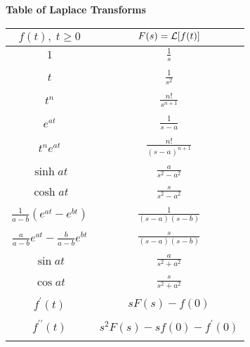 \renewcommand{\baselinestretch}{1.1}

\pagestyle{empty}
\setlength{\textheight}{300mm}
\setlength{\topmargin}{-30mm}
\pagestyle{empty}


\begin{center}
{\large\bf Table of Laplace Transforms}\\
\vspace{0.5cm}
\begin{tabular}{|c|c|}
\hline
$f(t), \; t \geq 0 $ & $ F(s) = {\cal L}[f(t)]$\\
\hline
$1$ &$\frac{1}{s}$  \\
 & \\
$t$ &$\frac{1}{s^{2}}$  \\
& \\
$t^{n}$ &$\frac{n!}{s^{n+1}}$\\
& \\
$e^{at}$&$\frac{1}{s-a}$\\
& \\
$t^{n}e^{at}$&$\frac{n!}{(s-a)^{n+1}}$\\
& \\
$\sinh at$&$\frac{a}{s^{2}-a^{2}}$\\
& \\
$\cosh at$&$\frac{s}{s^{2}-a^{2}}$\\
& \\
$ \frac{1}{a-b}(e^{at}-e^{bt}) $ & $ \frac{1}{(s-a)(s-b)} $\\
& \\
$\frac{a}{a-b}e^{at} - \frac{b}{a-b}e^{bt} $ & $\frac{s}{(s-a)(s-b)} $ \\
& \\
$\sin at$&$\frac{a}{s^{2}+a^{2}}$\\
& \\
$\cos at$&$\frac{s}{s^{2}+a^{2}}$\\
& \\
$f^{\prime}(t)$&$sF(s)-f(0)$\\
& \\
$f^{\prime \prime}(t)$&$s^{2}F(s)-sf(0)-f^{\prime}(0)$\\
& \\

\end{tabular}
\end{center}

